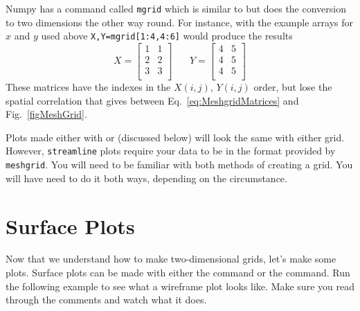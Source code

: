 Numpy has a command called {\tt mgrid} which is similar to
 but does the conversion to two dimensions the other
way round. For instance, with the example arrays for $x$ and $y$ used
above {\tt X,Y=mgrid[1:4,4:6]} would produce the results
\begin{equation}
X = \left[ \begin{array}{ll}
1 & 1 \\
2 & 2 \\
3 & 3 \\
\end{array}
\right]~~~~~~~~ Y = \left[ \begin{array}{ll}
4 & 5 \\
4 & 5 \\
4 & 5 \\
\end{array}
\right]
\end{equation}
These matrices have the indexes in the $X(i,j)$, $Y(i,j)$ order,
but lose the spatial correlation that  gives
between Eq.~\eqref{eq:MeshgridMatrices} and Fig.~\ref{figMeshGrid}.

Plots made either with  or  (discussed below) will look
the same with either grid.  However, {\tt streamline} plots require your
data to be in the format provided by {\tt meshgrid}.  You will need to be
familiar with both methods of creating a grid. You will have need to do
it both ways, depending on the circumstance.



\section{Surface Plots}
 

Now that we understand how to make two-dimensional grids, let's make
some plots. Surface plots can be made with either the
 command or the 
command.  Run the following example to see what a wireframe plot looks
like. Make sure you read through the comments and watch what it does.

